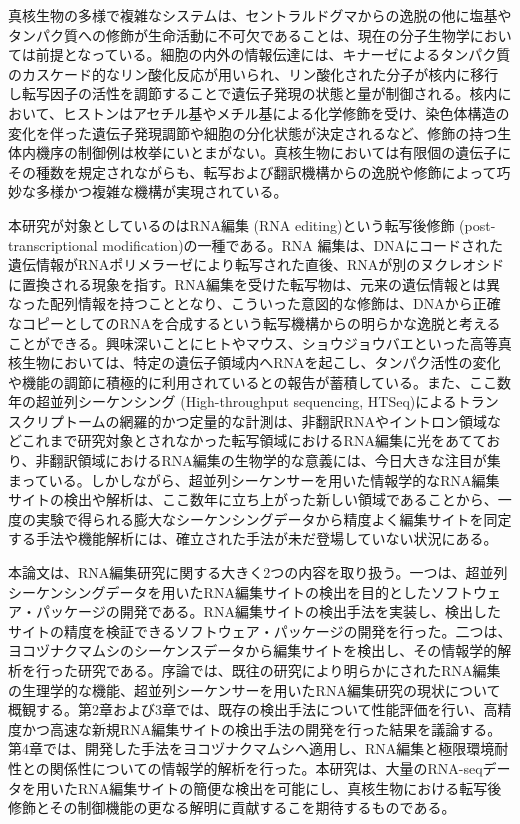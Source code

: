 \par
真核生物の多様で複雑なシステムは、セントラルドグマからの逸脱の他に塩基やタンパク質への修飾が生命活動に不可欠であることは、現在の分子生物学においては前提となっている。細胞の内外の情報伝達には、キナーゼによるタンパク質のカスケード的なリン酸化反応が用いられ、リン酸化された分子が核内に移行し転写因子の活性を調節することで遺伝子発現の状態と量が制御される。核内において、ヒストンはアセチル基やメチル基による化学修飾を受け、染色体構造の変化を伴った遺伝子発現調節や細胞の分化状態が決定されるなど、修飾の持つ生体内機序の制御例は枚挙にいとまがない。真核生物においては有限個の遺伝子にその種数を規定されながらも、転写および翻訳機構からの逸脱や修飾によって巧妙な多様かつ複雑な機構が実現されている。
\par
本研究が対象としているのはRNA編集 (RNA editing)という転写後修飾 (post-transcriptional modification)の一種である。RNA 
編集は、DNAにコードされた遺伝情報がRNAポリメラーゼにより転写された直後、RNAが別のヌクレオシドに置換される現象を指す。RNA編集を受けた転写物は、元来の遺伝情報とは異なった配列情報を持つこととなり、こういった意図的な修飾は、DNAから正確なコピーとしてのRNAを合成するという転写機構からの明らかな逸脱と考えることができる。興味深いことにヒトやマウス、ショウジョウバエといった高等真核生物においては、特定の遺伝子領域内へRNAを起こし、タンパク活性の変化や機能の調節に積極的に利用されているとの報告が蓄積している。また、ここ数年の超並列シーケンシング (High-throughput sequencing, HTSeq)によるトランスクリプトームの網羅的かつ定量的な計測は、非翻訳RNAやイントロン領域などこれまで研究対象とされなかった転写領域におけるRNA編集に光をあてており、非翻訳領域におけるRNA編集の生物学的な意義には、今日大きな注目が集まっている。しかしながら、超並列シーケンサーを用いた情報学的なRNA編集サイトの検出や解析は、ここ数年に立ち上がった新しい領域であることから、一度の実験で得られる膨大なシーケンシングデータから精度よく編集サイトを同定する手法や機能解析には、確立された手法が未だ登場していない状況にある。
\par
本論文は、RNA編集研究に関する大きく2つの内容を取り扱う。一つは、超並列シーケンシングデータを用いたRNA編集サイトの検出を目的としたソフトウェア・パッケージの開発である。RNA編集サイトの検出手法を実装し、検出したサイトの精度を検証できるソフトウェア・パッケージの開発を行った。二つは、ヨコヅナクマムシのシーケンスデータから編集サイトを検出し、その情報学的解析を行った研究である。序論では、既往の研究により明らかにされたRNA編集の生理学的な機能、超並列シーケンサーを用いたRNA編集研究の現状について概観する。第2章および3章では、既存の検出手法について性能評価を行い、高精度かつ高速な新規RNA編集サイトの検出手法の開発を行った結果を議論する。第4章では、開発した手法をヨコヅナクマムシへ適用し、RNA編集と極限環境耐性との関係性についての情報学的解析を行った。本研究は、大量のRNA-seqデータを用いたRNA編集サイトの簡便な検出を可能にし、真核生物における転写後修飾とその制御機能の更なる解明に貢献するこを期待するものである。

